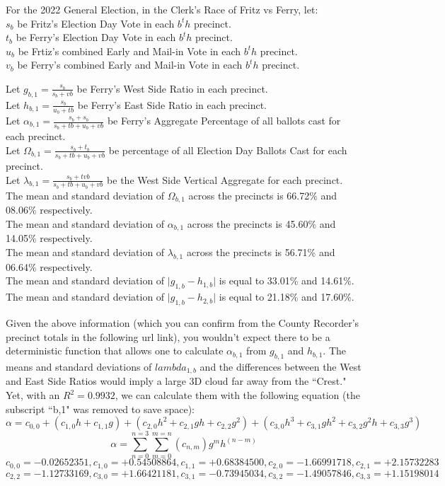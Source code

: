 For the 2022 General Election, in the Clerk's Race of Fritz vs Ferry, let:\\
$s_{b}$ be Fritz's Election Day Vote in each $b^th$ precinct.\\
$t_{b}$ be Ferry's Election Day Vote in each $b^th$ precinct.\\
$u_{b}$ be Frtiz's combined Early and Mail-in Vote in each $b^th$ precinct.\\
$v_{b}$ be Ferry's combined Early and Mail-in Vote in each $b^th$ precinct.

Let $g_{b,1}=\frac{s_{b}}{s_{b}+v{b}}$ be Ferry's West Side Ratio in each precinct.\\
Let $h_{b,1}=\frac{s_{b}}{u_{b}+t{b}}$ be Ferry's East Side Ratio in each precinct.\\
Let $\alpha_{b,1}=\frac{s_{b}+s_{b}}{s_{b}+t{b}+u_{b}+v{b}}$ be Ferry's Aggregate Percentage of all ballots cast for each precinct.\\
Let $\Omega_{b,1}=\frac{s_{b}+t_{b}}{s_{b}+t{b}+u_{b}+v{b}}$ be percentage of all Election Day Ballots Cast for each precinct.\\
Let $\lambda_{b,1}=\frac{s_{b}+tv{b}}{s_{b}+t{b}+u_{b}+v{b}}$ be the West Side Vertical Aggregate for each precinct.\\

The mean and standard deviation of $\Omega_{b,1}$ across the precincts is 66.72\% and 08.06\% respectively.\\
The mean and standard deviation of $\alpha_{b,1}$ across the precincts is 45.60\% and 14.05\% respectively.\\
The mean and standard deviation of $\lambda_{b,1}$ across the precincts is 56.71\% and 06.64\% respectively.\\
The mean and standard deviation of $\lvert g_{1,b}-h_{1,b} \rvert$ is equal to 33.01\% and 14.61\%.\\
The mean and standard deviation of $\lvert g_{1,b}-h_{2,b} \rvert$ is equal to 21.18\% and 17.60\%.

Given the above information (which you can confirm from the County Recorder's precinct totals in the following url link), you wouldn't expect there to be a deterministic function that allows one to calculate $\alpha_{b,1}$ from $g_{b,1}$ and $h_{b,1}$. The means and standard deviations of $lambda_{1,b}$ and the differences between the West and East Side Ratios would imply a large 3D cloud far away from the ``Crest."  Yet, with an $R^2=0.9932$, we can calculate them with the following equation (the subscript ``b,1" was removed to save space):
$$\alpha=c_{0,0}+(c_{1,0}h+c_{1,1}g)+(c_{2,0}h^2+c_{2,1}gh+c_{2,2}g^2)+(c_{3,0}h^3+c_{3,1}gh^2+c_{3,2}g^2h+c_{3,3}g^3)$$
$$\alpha=\sum_{n=0}^{n=3}\sum_{m=0}^{m=n}(c_{n,m})g^mh^{(n-m)}$$
$$c_{0,0}=-0.02652351, c_{1,0}=+0.54508864, c_{1,1}=+0.68384500, c_{2,0}=-1.66991718, c_{2,1}=+2.15732283$$
$$c_{2,2}=-1.12733169, c_{3,0}=+1.66421181, c_{3,1}=-0.73945034, c_{3,2}=-1.49057846, c_{3,3}=+1.15198014$$


